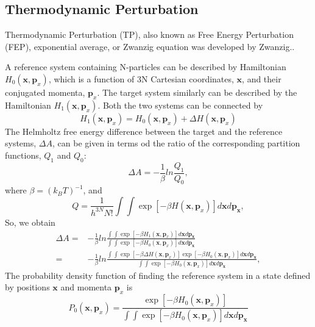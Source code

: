 \subsection{Thermodynamic Perturbation\label{Sec:FEM:TP}}
Thermodynamic Perturbation (TP), also known as Free Energy Perturbation (FEP), exponential average, or Zwanzig equation was developed by Zwanzig.\cite{ZwanzigJCP1954}. 

A reference system containing N-particles can be described by Hamiltonian $H_{0}(\textbf{x},\textbf{p}_{x})$, which is a function of 3N Cartesian coordinates, $\textbf{x}$, and their conjugated momenta, $\textbf{p}_{x}$. The target system similarly can be described by the Hamiltonian $H_{1}(\textbf{x},\textbf{p}_{x})$. Both the two systems can be connected by 
\begin{equation}
H_{1}(\textbf{x},\textbf{p}_{x}) = H_{0}(\textbf{x},\textbf{p}_{x}) + \Delta H (\textbf{x},\textbf{p}_{x})
\label{Eq:deltaH}
\end{equation}
The Helmholtz free energy difference between the target and the reference systems, $\Delta A$, can be given in terms od the ratio of the corresponding partition functions, $Q_{1}$ and $Q_{0}$:
\begin{equation}
\Delta A  =  -\frac{1}{\beta}ln\frac{Q_{1}}{Q_{0}},
\label{Eq:deltaA}
\end{equation}
where $\beta = {(k_{B}T)}^{-1}$, and
\begin{equation}
Q = \frac{1}{{h}^{3N}N!} \int\int \exp[-\beta H(\textbf{x},\textbf{p}_{x})] d\textbf{x}d\textbf{p}_\textbf{x},
\label{Eq:PF}
\end{equation}
So, we obtain
\begin{align}
\Delta A  =&  -\frac{1}{\beta}ln\frac{\int\int \exp[-\beta H_{1}(\textbf{x},\textbf{p}_{x}) ] d\textbf{x}d\textbf{p}_\textbf{x}}{\int\int \exp[-\beta H_{0}(\textbf{x},\textbf{p}_{x}) ] d\textbf{x}d\textbf{p}_\textbf{x}} \\
=& -\frac{1}{\beta}ln\frac{\int\int \exp[-\beta \Delta H(\textbf{x},\textbf{p}_{x})] \exp[-\beta H_{0}(\textbf{x},\textbf{p}_{x}) ] d\textbf{x}d\textbf{p}_\textbf{x}}{\int\int \exp[-\beta H_{0}(\textbf{x},\textbf{p}_{x}) ] d\textbf{x}d\textbf{p}_\textbf{x}},
\label{Eq:deltaA2}
\end{align}
The probability density function of finding the reference system in a state defined by positions $\textbf{x}$ and momenta $\textbf{p}_{x}$ is 
\begin{equation}
P_{0}(\textbf{x},\textbf{p}_{x}) = \frac{ \exp[-\beta H_{0}(\textbf{x},\textbf{p}_{x}) ] }{\int\int \exp[-\beta H_{0}(\textbf{x},\textbf{p}_{x}) ] d\textbf{x}d\textbf{p}_\textbf{x}}
\label{Eq:proden}
\end{equation}
